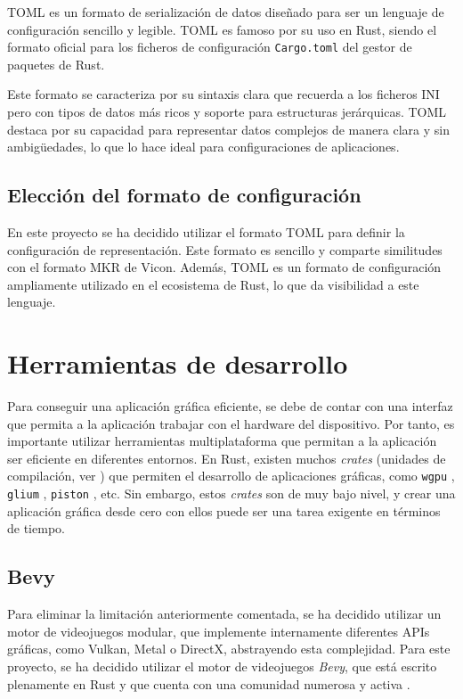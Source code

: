 \ac{TOML} es un formato de serialización de datos diseñado para ser un lenguaje de configuración sencillo y legible. \ac{TOML} es famoso por su uso en Rust, siendo el formato oficial para los ficheros de configuración \texttt{Cargo.toml} del gestor de paquetes de Rust.

Este formato se caracteriza por su sintaxis clara que recuerda a los ficheros INI pero con tipos de datos más ricos y soporte para estructuras jerárquicas. \ac{TOML} destaca por su capacidad para representar datos complejos de manera clara y sin ambigüedades, lo que lo hace ideal para configuraciones de aplicaciones.


\subsection{Elección del formato de configuración}

En este proyecto se ha decidido utilizar el formato \ac{TOML} para definir la configuración de representación. Este formato es sencillo y comparte similitudes con el formato MKR de Vicon. Además, \ac{TOML} es un formato de configuración ampliamente utilizado en el ecosistema de Rust, lo que da visibilidad a este lenguaje.

\section{Herramientas de desarrollo}
Para conseguir una aplicación gráfica eficiente, se debe de contar con una interfaz que permita a la aplicación trabajar con el hardware del dispositivo. Por tanto, es importante utilizar herramientas multiplataforma que permitan a la aplicación ser eficiente en diferentes entornos. En Rust, existen muchos \textit{crates} (unidades de compilación, ver \autocite{PackagesCratesRust}) que permiten el desarrollo de aplicaciones gráficas, como \texttt{wgpu} \autocite{WgpuPortableGraphics}, \texttt{glium} \autocite{GliumGlium2025}, \texttt{piston} \autocite{PistonModularOpen}, etc. Sin embargo, estos \textit{crates} son de muy bajo nivel, y crear una aplicación gráfica desde cero con ellos puede ser una tarea exigente en términos de tiempo. 

\subsection{Bevy} \label{subsec:bevy}
Para eliminar la limitación anteriormente comentada, se ha decidido utilizar un motor de videojuegos modular, que implemente internamente diferentes APIs gráficas, como Vulkan, Metal o DirectX, abstrayendo esta complejidad. Para este proyecto, se ha decidido utilizar el motor de videojuegos \textit{Bevy}, que está escrito plenamente en Rust y que cuenta con una comunidad numerosa y activa \autocite{BevyEngine}.

